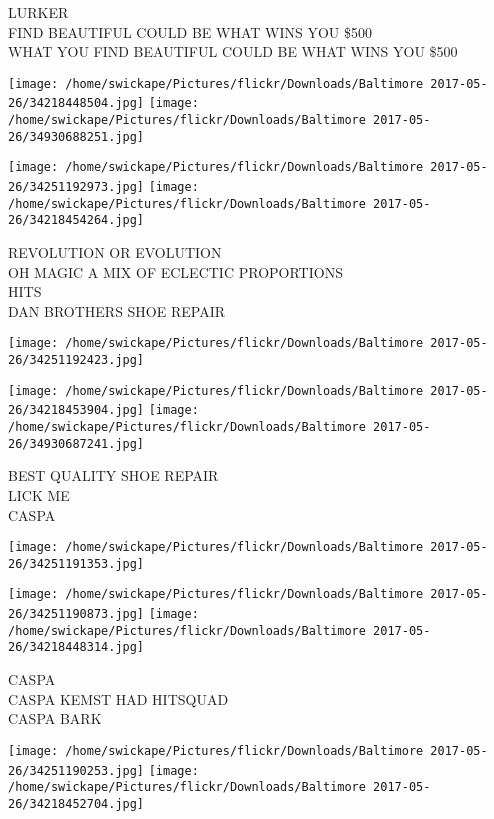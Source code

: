 \documentclass[10pt,letterpaper]{article}
\begin{document}
LURKER\\
FIND BEAUTIFUL COULD BE WHAT WINS YOU \$500\\
WHAT YOU FIND BEAUTIFUL COULD BE WHAT WINS YOU \$500
\pagebreak

\texttt{[image: /home/swickape/Pictures/flickr/Downloads/Baltimore 2017-05-26/34218448504.jpg]}
\texttt{[image: /home/swickape/Pictures/flickr/Downloads/Baltimore 2017-05-26/34930688251.jpg]}

\texttt{[image: /home/swickape/Pictures/flickr/Downloads/Baltimore 2017-05-26/34251192973.jpg]}
\texttt{[image: /home/swickape/Pictures/flickr/Downloads/Baltimore 2017-05-26/34218454264.jpg]}

REVOLUTION OR EVOLUTION\\
OH MAGIC A MIX OF ECLECTIC PROPORTIONS\\
HITS\\
DAN BROTHERS SHOE REPAIR
\pagebreak

\texttt{[image: /home/swickape/Pictures/flickr/Downloads/Baltimore 2017-05-26/34251192423.jpg]}

\vspace{0.25in}
\texttt{[image: /home/swickape/Pictures/flickr/Downloads/Baltimore 2017-05-26/34218453904.jpg]}
\texttt{[image: /home/swickape/Pictures/flickr/Downloads/Baltimore 2017-05-26/34930687241.jpg]}

BEST QUALITY SHOE REPAIR\\
LICK ME\\
CASPA
\pagebreak

\texttt{[image: /home/swickape/Pictures/flickr/Downloads/Baltimore 2017-05-26/34251191353.jpg]}

\vspace{0.25in}
\texttt{[image: /home/swickape/Pictures/flickr/Downloads/Baltimore 2017-05-26/34251190873.jpg]}
\texttt{[image: /home/swickape/Pictures/flickr/Downloads/Baltimore 2017-05-26/34218448314.jpg]}

CASPA\\
CASPA KEMST HAD HITSQUAD\\
CASPA BARK
\pagebreak

\texttt{[image: /home/swickape/Pictures/flickr/Downloads/Baltimore 2017-05-26/34251190253.jpg]}
\texttt{[image: /home/swickape/Pictures/flickr/Downloads/Baltimore 2017-05-26/34218452704.jpg]}
\end{document}

